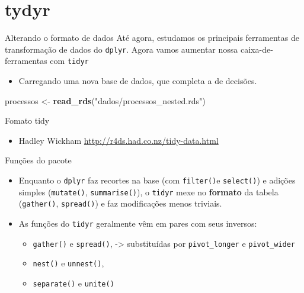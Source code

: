 \documentclass[
  10pt,
  ignorenonframetext,
]{beamer}
\newenvironment{Shaded}{\begin{snugshade}}{\end{snugshade}}
\newcommand{\KeywordTok}[1]{\textcolor[rgb]{0.13,0.29,0.53}{\textbf{#1}}}
\newcommand{\NormalTok}[1]{#1}
\newcommand{\StringTok}[1]{\textcolor[rgb]{0.31,0.60,0.02}{#1}}
\providecommand{\tightlist}{%
  \setlength{\itemsep}{0pt}\setlength{\parskip}{0pt}}
\begin{document}
\hypertarget{tydyr}{%
\section{tydyr}\label{tydyr}}

\begin{frame}[fragile]{Alterando o formato de dados}
\protect\hypertarget{alterando-o-formato-de-dados}{}
Até agora, estudamos os principais ferramentas de transformação de dados
do \texttt{dplyr}. Agora vamos aumentar nossa caixa-de-ferramentas com
\texttt{tidyr}

\begin{itemize}
\tightlist
\item
  Carregando uma nova base de dados, que completa a de decisões.
\end{itemize}

\begin{Shaded}
\begin{Highlighting}[]
\NormalTok{processos \textless{}{-}}\StringTok{ }\KeywordTok{read\_rds}\NormalTok{(}\StringTok{"dados/processos\_nested.rds"}\NormalTok{)}
\end{Highlighting}
\end{Shaded}
\end{frame}

\begin{frame}{Fomato tidy}
\protect\hypertarget{fomato-tidy}{}
\begin{itemize}
\tightlist
\item
  Hadley Wickham \url{http://r4ds.had.co.nz/tidy-data.html}
\end{itemize}
\end{frame}

\begin{frame}[fragile]{Funções do pacote}
\protect\hypertarget{funuxe7uxf5es-do-pacote}{}
\begin{itemize}
\item
  Enquanto o \texttt{dplyr} faz recortes na base (com \texttt{filter()}e
  \texttt{select()}) e adições simples (\texttt{mutate()},
  \texttt{summarise()}), o \texttt{tidyr} mexe no \textbf{formato} da
  tabela (\texttt{gather()}, \texttt{spread()}) e faz modificações menos
  triviais.
\item
  As funções do \texttt{tidyr} geralmente vêm em pares com seus
  inversos:

  \begin{itemize}
  \tightlist
  \item
    \texttt{gather()} e \texttt{spread()}, -\textgreater{} substituídas
    por \texttt{pivot\_longer} e \texttt{pivot\_wider}
  \item
    \texttt{nest()} e \texttt{unnest()},
  \item
    \texttt{separate()} e \texttt{unite()}
  \end{itemize}
\end{itemize}
\end{frame}
\end{document}
